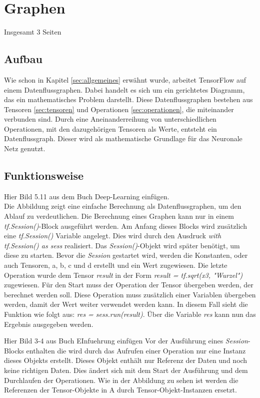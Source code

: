 \section{Graphen}
\label{sec:graphen}
\printsubchapterauthor{\authorNiklas}
Insgesamt 3 Seiten

\subsection{Aufbau}
\label{sec:graphenAufbau}

Wie schon in Kapitel \ref{sec:allgemeines} erwähnt wurde, arbeitet TensorFlow auf einem Datenflussgraphen. Dabei handelt es sich um ein gerichtetes Diagramm, das ein mathematisches Problem darstellt. Diese Datenflussgraphen bestehen aus Tensoren \ref{sec:tensoren} und Operationen \ref{sec:operationen}, die miteinander verbunden sind. Durch eine Aneinanderreihung von unterschiedlichen Operationen, mit den dazugehörigen Tensoren als Werte, entsteht ein Datenflussgraph. Dieser wird als mathematische Grundlage für das Neuronale Netz genutzt.

\subsection{Funktionsweise}
\label{sec:graphenFunktionsweise}
Hier Bild 5.11 aus dem Buch Deep-Learning einfügen.\\
Die Abbildung zeigt eine einfache Berechnung als Datenflussgraphen, um den Ablauf zu verdeutlichen. Die Berechnung eines Graphen kann nur in einem \textit{tf.Session()}-Block ausgeführt werden. Am Anfang dieses Blocks wird zusätzlich eine \textit{tf.Session()} Variable angelegt. Dies wird durch den Ausdruck \textit{with tf.Session() as sess} realisiert. Das \textit{Session()}-Objekt wird später benötigt, um diese zu starten. Bevor die \textit{Session} gestartet wird, werden die Konstanten, oder auch Tensoren, a, b, c und d erstellt und ein Wert zugewiesen. Die letzte Operation wurde dem Tensor \textit{result} in der Form \textit{result = tf.sqrt(x3, "Wurzel")} zugewiesen. Für den Start muss der Operation der Tensor übergeben werden, der berechnet werden soll. Diese Operation muss zusätzlich einer Variablen übergeben werden, damit der Wert weiter verwendet werden kann. In diesem Fall sieht die Funktion wie folgt aus: \textit{res = sess.run(result)}. Über die Variable \textit{res} kann nun das Ergebnis ausgegeben werden.

Hier Bild 3-4 aus Buch EInfuehrung einfügen
Vor der Ausführung eines \textit{Session}-Blocks enthalten die wird durch das Aufrufen einer Operation nur eine Instanz dieses Objekts erstellt. Dieses Objekt enthält nur Referenz der Daten und noch keine richtigen Daten. Dies ändert sich mit dem Start der Ausführung und dem Durchlaufen der Operationen. Wie in der Abbildung zu sehen ist werden die Referenzen der Tensor-Objekte in A durch Tensor-Objekt-Instanzen ersetzt.


